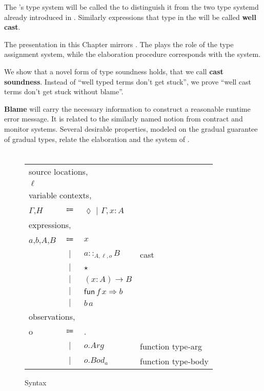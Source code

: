The \clang{}'s type system will be called the \textbf{\csys{}} to distinguish it from the two type systemd already introduced in .
Similarly expressions that type in the \csys{} will be called \textbf{well cast}.
 
The presentation in this Chapter mirrors .
The \csys{} plays the role of the type assignment system, while the elaboration procedure corresponds with the \bidir{} system.
 
We show that a novel form of type soundness holds, that we call \textbf{cast soundness}.
Instead of ``well typed terms don't get stuck'', we prove ``well cast terms don't get stuck without blame''.
 
\textbf{Blame} will carry the necessary information to construct a reasonable runtime error message.
It is related to the similarly named notion from contract and monitor systems. %
Several desirable properties, modeled on the gradual guarantee of gradual types, relate the \csys{} elaboration and the \bidir{} system of .

\section{\CLang{}}
 
\begin{figure}
\begin{tabular}{lcll}
\multicolumn{4}{l}{source locations,}\tabularnewline
$\ensuremath{\ell}$ &  &  & \tabularnewline
\multicolumn{4}{l}{variable contexts,}\tabularnewline
$\Gamma$,$H$ & $\Coloneqq$ & $\lozenge$ $|$ $\Gamma,x:A$ & \tabularnewline
\multicolumn{4}{l}{expressions,}\tabularnewline
$a$,$b$,$A$,$B$ & $\Coloneqq$ & $x$ & \tabularnewline
& $|$ & $a::_{A,\ensuremath{\ell},o}B$ & cast\tabularnewline
& $|$ & $\star$ & \tabularnewline
& $|$ & $\left(x:A\right)\rightarrow B$ & \tabularnewline
& $|$ & $\mathsf{fun}\,f\,x\Rightarrow b$ & \tabularnewline
& $|$ & $b\,a$ & \tabularnewline
\multicolumn{4}{l}{observations,}\tabularnewline
o & $\Coloneqq$ & . & \tabularnewline
& $|$ & $o.Arg$ & function type-arg\tabularnewline
& $|$ & $o.Bod_a$ & function type-body\tabularnewline
\end{tabular}


\caption{\CLang{} Syntax}
\label{fig:cast-pre-syntax}
\end{figure}

